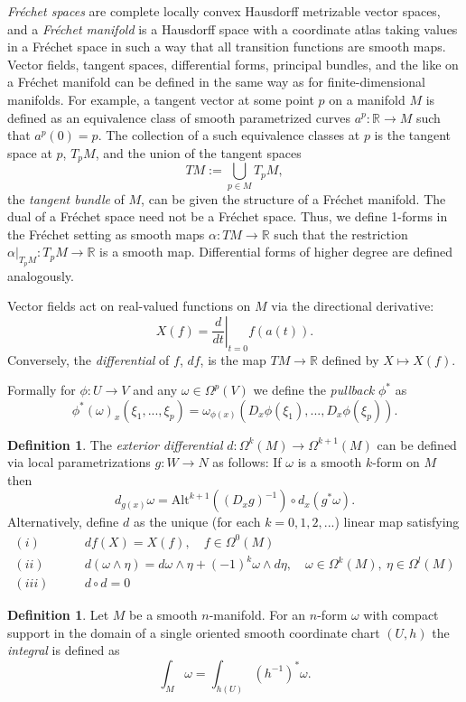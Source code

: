\documentclass{article}
\theoremstyle{plain}
\theoremstyle{definition}
\newtheorem{defin}[teo]{Definition}
\numberwithin{equation}{section}
\newcommand{\R}{\ensuremath{\mathbb{R}}}
\newcommand{\Alt}{\ensuremath{\mathrm{Alt}}}
\begin{document}
\textit{Fréchet spaces} are complete locally convex Hausdorff metrizable vector spaces, and a \textit{Fréchet manifold} is a Hausdorff space with a coordinate atlas taking values in a Fréchet space in such a way that all transition functions are smooth maps. Vector fields, tangent spaces, differential forms, principal bundles, and the like on a Fréchet manifold can be defined in the same way as for finite-dimensional manifolds. For example, a tangent vector at some point $p$ on a manifold $M$ is defined as an equivalence class of smooth parametrized curves $a^p:\R\to M$ such that $a^p(0)=p$. The collection of a such equivalence classes at $p$ is the tangent space at $p$, $T_pM$, and the union of the tangent spaces
\[
TM:=\bigcup_{p\in M}T_pM,
\]
the \textit{tangent bundle} of $M$, can be given the structure of a Fréchet manifold. The dual of a Fréchet space need not be a Fréchet space. Thus, we define 1-forms in the Fréchet setting as smooth maps $\alpha: TM\to\R$ such that the restriction $\alpha|_{T_pM}:T_pM\to\R$ is a smooth map. Differential forms of higher degree are defined analogously.

Vector fields act on real-valued functions on $M$ via the directional derivative:
\[
  X(f)=\left.\frac{d}{dt}\right|_{t=0} f(a(t)).
\]
Conversely, the \textit{differential} of $f$, $df$, is the map $TM\to \R$ defined by $X\mapsto X(f)$.

Formally for $\phi: U\to V$ and any $\omega\in \Omega^p(V)$ we define the \textit{pullback} $\phi^*$ as
\[
 \phi^*(\omega)_x(\xi_1,...,\xi_p)=\omega_{\phi(x)}\left(D_x\phi(\xi_1),...,D_x\phi(\xi_p)\right).
\]


\begin{defin}
	The \textit{exterior differential} $d:\Omega^k(M)\to \Omega^{k+1}(M)$ can be defined via local parametrizations $g:W\to N$ as follows: If $\omega$ is a smooth $k$-form on $M$ then
	\[
	d_{g(x)}\omega= \Alt^{k+1}\left((D_xg)^{-1}\right)\circ d_x(g^*\omega).
	\]
	Alternatively, define $d$ as the unique (for each $k=0,1,2,...$) linear map satisfying
	\begin{align*}
	(i)\qquad & df(X)=X(f),\quad f\in\Omega^0(M)\\
	(ii)\qquad & d(\omega\wedge \eta)=d\omega\wedge \eta + (-1)^k\omega\wedge d\eta,\quad \omega\in\Omega^k(M),\ \eta\in\Omega^l(M)\\
	(iii)\qquad & d\circ d=0
	\end{align*}
\end{defin}


\begin{defin}
	Let $M$ be a smooth $n$-manifold. For an $n$-form $\omega$ with compact support in the domain of a single oriented smooth coordinate chart $(U,h)$ the \textit{integral} is defined as 
	\[
	\int_M\omega = \int_{h(U)}\left(h^{-1}\right)^*\omega.
	\] 
\end{defin}
\end{document}
